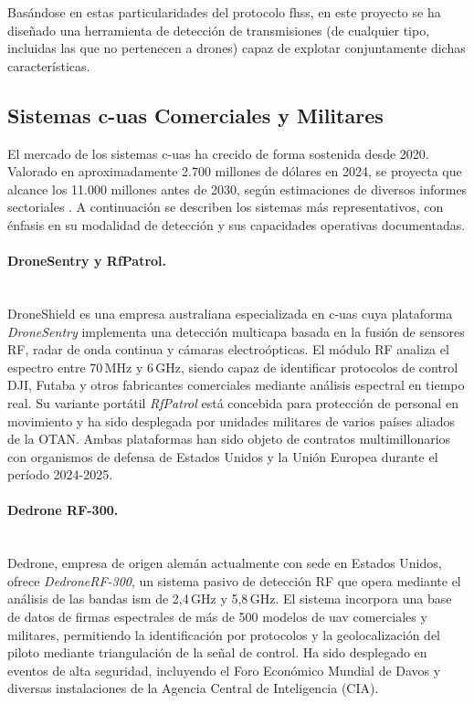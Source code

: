 Basándose en estas particularidades del protocolo \gls{fhss}, en este proyecto se ha diseñado una herramienta de detección de transmisiones (de cualquier tipo, incluidas las que no pertenecen a drones) capaz de explotar conjuntamente dichas características.

\subsection{Sistemas \gls{c-uas} Comerciales y Militares}
\label{subsec:sistemas_comerciales}

El mercado de los sistemas \gls{c-uas} ha crecido de forma sostenida desde 2020. Valorado en aproximadamente 2.700 millones de dólares en 2024, se proyecta que alcance los 11.000 millones antes de 2030, según estimaciones de diversos informes sectoriales \cite{dod_cuas_2021}. A continuación se describen los sistemas más representativos, con énfasis en su modalidad de detección y sus capacidades operativas documentadas.

\paragraph{DroneSentry y RfPatrol.}\mbox{}\\[0.5em] 
DroneShield es una empresa australiana especializada en \gls{c-uas} cuya plataforma \textit{DroneSentry} implementa una detección multicapa basada en la fusión de sensores RF, radar de onda continua y cámaras electroópticas. El módulo RF analiza el espectro entre 70\,MHz y 6\,GHz, siendo capaz de identificar protocolos de control DJI, Futaba y otros fabricantes comerciales mediante análisis espectral en tiempo real. Su variante portátil \textit{RfPatrol} está concebida para protección de personal en movimiento y ha sido desplegada por unidades militares de varios países aliados de la OTAN. Ambas plataformas han sido objeto de contratos multimillonarios con organismos de defensa de Estados Unidos y la Unión Europea durante el período 2024-2025.

\paragraph{Dedrone RF-300.}\mbox{}\\[0.5em] Dedrone, empresa de origen alemán actualmente con sede en Estados Unidos, ofrece \textit{DedroneRF-300}, un sistema pasivo de detección RF que opera mediante el análisis de las bandas \gls{ism} de 2,4\,GHz y 5,8\,GHz. El sistema incorpora una base de datos de firmas espectrales de más de 500 modelos de \gls{uav} comerciales y militares, permitiendo la identificación por protocolos y la geolocalización del piloto mediante triangulación de la señal de control. Ha sido desplegado en eventos de alta seguridad, incluyendo el Foro Económico Mundial de Davos y diversas instalaciones de la Agencia Central de Inteligencia (CIA).

